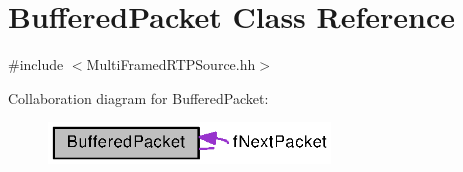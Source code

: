 \section{Buffered\+Packet Class Reference}
\label{classBufferedPacket}


{\ttfamily \#include $<$Multi\+Framed\+R\+T\+P\+Source.\+hh$>$}



Collaboration diagram for Buffered\+Packet\+:
\nopagebreak
\begin{figure}[H]
\begin{center}
\leavevmode
\includegraphics[width=212pt]{classBufferedPacket__coll__graph}
\end{center}
\end{figure}

